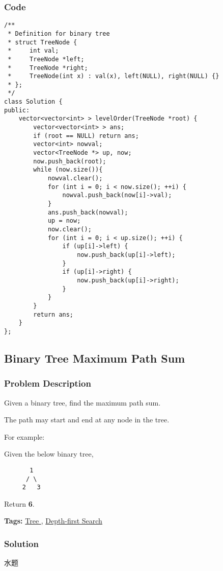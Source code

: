 \documentclass{article}
\begin{document}
\begin{CJK*}{UTF8}{gkai}
\subsubsection*{Code}
\begin{lstlisting}
/**
 * Definition for binary tree
 * struct TreeNode {
 *     int val;
 *     TreeNode *left;
 *     TreeNode *right;
 *     TreeNode(int x) : val(x), left(NULL), right(NULL) {}
 * };
 */
class Solution {
public:
    vector<vector<int> > levelOrder(TreeNode *root) {
        vector<vector<int> > ans;
        if (root == NULL) return ans;
        vector<int> nowval;
        vector<TreeNode *> up, now;
        now.push_back(root);
        while (now.size()){
            nowval.clear();
            for (int i = 0; i < now.size(); ++i) {
                nowval.push_back(now[i]->val);
            }
            ans.push_back(nowval);
            up = now;
            now.clear();
            for (int i = 0; i < up.size(); ++i) {
                if (up[i]->left) {
                    now.push_back(up[i]->left);
                }
                if (up[i]->right) {
                    now.push_back(up[i]->right);
                }
            }
        }
        return ans;
    }
}; 
\end{lstlisting}


\subsection{ Binary Tree Maximum Path Sum }
\label{ Binary Tree Maximum Path Sum }

\subsubsection*{Problem Description}
Given a binary tree, find the maximum path sum.

The path may start and end at any node in the tree.

For example:


Given the below binary tree,
\begin{verbatim}
       1
      / \
     2   3
\end{verbatim}

Return \textbf{6}.


\textbf{Tags: }
\hyperref[ Tree ]{ Tree },  \hyperref[ Depth-first Search ]{ Depth-first Search }



\subsubsection*{Solution}
水题


\end{CJK*}
\end{document}
